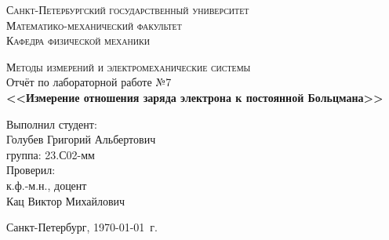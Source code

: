 \begin{titlepage}
\begin{center}
\textsc{Санкт-Петербургский государственный университет\\
Математико-механический факультет\\
Кафедра физической механики\\}

\vfill

\textsc{Методы измерений и электромеханические системы\\[3mm]}
Отчёт по лабораторной работе №7\\[6mm]


\textbf{\large<<Измерение отношения заряда электрона к постоянной Больцмана>>}

\vfill
\end{center}

\hfill
\begin{minipage}{.5\textwidth}
Выполнил студент:\\[2mm] 
Голубев Григорий Альбертович\\
группа: 23.С02-мм\\[5mm]

Проверил:\\[2mm] 
к.ф.-м.н., доцент\\
Кац Виктор Михайлович
\end{minipage}%
\vfill
\begin{center}
 Санкт-Петербург, \yeardate\today\ г.
\end{center}
\end{titlepage}